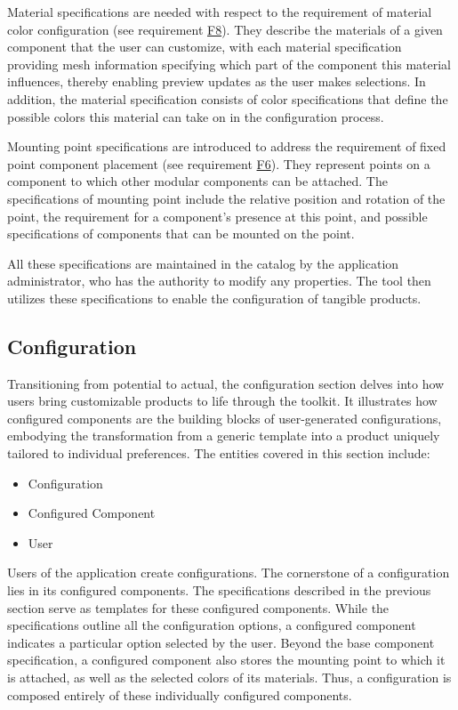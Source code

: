 Material specifications are needed with respect to the requirement of material color configuration (see requirement \hyperref[itm:F8]{F8}). They describe the materials of a given component that the user can customize, with each material specification providing mesh information specifying which part of the component this material influences, thereby enabling preview updates as the user makes selections. In addition, the material specification consists of color specifications that define the possible colors this material can take on in the configuration process.

Mounting point specifications are introduced to address the requirement of fixed point component placement (see requirement \hyperref[itm:F6]{F6}). They represent points on a component to which other modular components can be attached. The specifications of mounting point include the relative position and rotation of the point, the requirement for a component's presence at this point, and possible specifications of components that can be mounted on the point.

All these specifications are maintained in the catalog by the application administrator, who has the authority to modify any properties. The tool then utilizes these specifications to enable the configuration of tangible products.


\subsection{Configuration}

Transitioning from potential to actual, the configuration section delves into how users bring customizable products to life through the toolkit.
It illustrates how configured components are the building blocks of user-generated configurations, embodying the transformation from a generic template into a product uniquely tailored to individual preferences.
The entities covered in this section include:
\begin{itemize}[label=\rectanglebullet]
    \item Configuration
    \item Configured Component
    \item User
\end{itemize}

Users of the application create configurations. The cornerstone of a configuration lies in its configured components. The specifications described in the previous section serve as templates for these configured components. While the specifications outline all the configuration options, a configured component indicates a particular option selected by the user. Beyond the base component specification, a configured component also stores the mounting point to which it is attached, as well as the selected colors of its materials. Thus, a configuration is composed entirely of these individually configured components.


